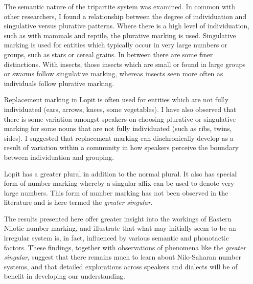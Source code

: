 \documentclass[output=paper]{langsci/langscibook}
\begin{document}
The semantic nature of the tripartite system was examined. In common with other researchers, I found a relationship between the degree of individuation and singulative versus plurative patterns. Where there is a high level of individuation, such as with mammals and reptile, the plurative marking is used. Singulative marking is used for entities which typically occur in very large numbers or groups, such as stars or cereal grains. In between there are some finer distinctions. With insects, those insects which are small or found in large groups or swarms follow singulative marking, whereas insects seen more often as individuals follow plurative marking.

Replacement marking in Lopit is often used for entities which are not fully individuated (ears, arrows, knees, some vegetables). I have also observed that there is some variation amongst speakers on choosing plurative or singulative marking for some nouns that are not fully individuated (such as ribs, twins, sides). I suggested that replacement marking can diachronically develop as a result of variation within a community in how speakers perceive the boundary between individuation and grouping.

Lopit has a greater plural in addition to the normal plural. It also has special form of number marking whereby a singular affix can be used to denote very large numbers. This form of number marking has not been observed in the literature and is here termed the \textit{greater singular}.

The results presented here offer greater insight into the workings of Eastern Nilotic number marking, and illustrate that what may initially seem to be an irregular system is, in fact, influenced by various semantic and phonotactic factors. These findings, together with observations of phenomena like the \textit{greater singular}, suggest that there remains much to learn about Nilo-Saharan number systems, and that detailed explorations across speakers and dialects will be of benefit in developing our understanding. 
\end{document}
